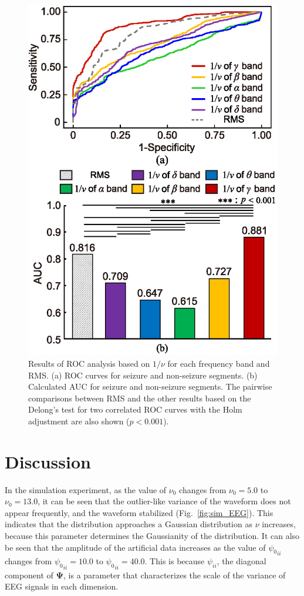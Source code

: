 \documentclass[journal]{IEEEtran}
\begin{document}
\begin{figure}[!t] %
\centering
\includegraphics[width=0.85\hsize]{figure/ROC_rms_ver10.eps}
\caption{Results of ROC analysis based on $1/\nu$ for each frequency band and RMS.
(a) ROC curves for seizure and non-seizure segments.
(b) Calculated AUC for seizure and non-seizure segments.
The pairwise comparisons between RMS and the other results based on the Delong's test for two correlated ROC curves with the Holm adjustment are also shown ($p<0.001$).}
\label{fig:roc}
\end{figure}

\section{Discussion}
In the simulation experiment, as the value of $\nu_0$ changes from $\nu_0 = 5.0$ to $\nu_0 = 13.0$, it can be seen that the outlier-like variance of the waveform does not appear frequently, and the waveform stabilized (Fig.~\ref{fig:sim_EEG}). 
This indicates that the distribution approaches a Gaussian distribution as $\nu$ increases, because this parameter determines the Gaussianity of the distribution.
It can also be seen that the amplitude of the artificial data increases as the value of ${\psi_0}_{ii}$ changes from ${\psi_0}_{ii}=10.0$ to ${\psi_0}_{ii}=40.0$.
This is because $\psi_{ii}$, the diagonal component of $\mathbf{\Psi}$, is a parameter that characterizes the scale of the variance of EEG signals in each dimension.
\end{document}
